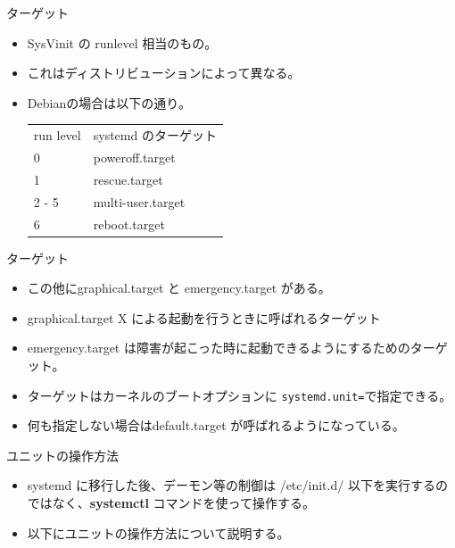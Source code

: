 \begin{frame}{ターゲット}
\begin{itemize}
\item SysVinit の runlevel 相当のもの。
\item これはディストリビューションによって異なる。
\item Debianの場合は以下の通り。

\begin{table}[h]
\begin{center}
  \begin{tabular}{ll}
    run level & systemd のターゲット \\
    0 & poweroff.target \\
    1 & rescue.target \\
    2 - 5 & multi-user.target \\
    6 & reboot.target \\
  \end{tabular}
\end{center}
\end{table}
\end{itemize}
\end{frame}

\begin{frame}{ターゲット}

\begin{itemize}
\item この他にgraphical.target と emergency.target がある。
\item graphical.target X による起動を行うときに呼ばれるターゲット
\item emergency.target は障害が起こった時に起動できるようにするためのターゲット。
\item ターゲットはカーネルのブートオプションに \texttt{systemd.unit=}で指定できる。
\item 何も指定しない場合はdefault.target が呼ばれるようになっている。
\end{itemize}

\end{frame}

\begin{frame}{ユニットの操作方法}

\begin{itemize}
\item systemd に移行した後、デーモン等の制御は /etc/init.d/ 以下を実行するのではなく、{\bf systemctl}
コマンドを使って操作する。
\item 以下にユニットの操作方法について説明する。
\end{itemize}

\end{frame}

